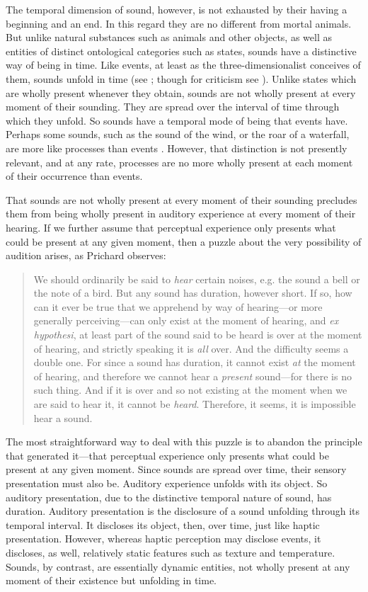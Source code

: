 The temporal dimension of sound, however, is not exhausted by their having a beginning and an end. In this regard they are no different from mortal animals. But unlike natural substances such as animals and other objects, as well as entities of distinct ontological categories such as states, sounds have a distinctive way of being in time. Like events, at least as the three-dimensionalist conceives of them, sounds unfold in time (see \citealt{Fine:2006fk}; though for criticism see \citealt{Sider:1997fk,Hawthorne:2008uq}). Unlike states which are wholly present whenever they obtain, sounds are not wholly present at every moment of their sounding. They are spread over the interval of time through which they unfold. So sounds have a temporal mode of being that events have. Perhaps some sounds, such as the sound of the wind, or the roar of a waterfall, are more like processes than events \citep[4]{Broad:1952kx}. However, that distinction is not presently relevant, and at any rate, processes are no more wholly present at each moment of their occurrence than events. 

That sounds are not wholly present at every moment of their sounding precludes them from being wholly present in auditory experience at every moment of their hearing. If we further assume that perceptual experience only presents what could be present at any given moment, then a puzzle about the very possibility of audition arises, as Prichard observes: 
\begin{quote}
	We should ordinarily be said to \emph{hear} certain noises, e.g. the sound a bell or the note of a bird. But any sound has duration, however short. If so, how can it ever be true that we apprehend by way of hearing---or more generally perceiving---can only exist at the moment of hearing, and \emph{ex hypothesi}, at least part of the sound said to be heard is over at the moment of hearing, and strictly speaking it is \emph{all} over. And the difficulty seems a double one. For since a sound has duration, it cannot exist \emph{at} the moment of hearing, and therefore we cannot hear a \emph{present} sound---for there is no such thing. And if it is over and so not existing at the moment when we are said to hear it, it cannot be \emph{heard}. Therefore, it seems, it is impossible hear a sound. \citep[47]{Prichard:1950ly}
\end{quote}
The most straightforward way to deal with this puzzle is to abandon the principle that generated it---that perceptual experience only presents what could be present at any given moment. Since sounds are spread over time, their sensory presentation must also be. Auditory experience unfolds with its object. So auditory presentation, due to the distinctive temporal nature of sound, has duration. Auditory presentation is the disclosure of a sound unfolding through its temporal interval. It discloses its object, then, over time, just like haptic presentation. However, whereas haptic perception may disclose events, it discloses, as well, relatively static features such as texture and temperature. Sounds, by contrast, are essentially dynamic entities, not wholly present at any moment of their existence but unfolding in time. 

